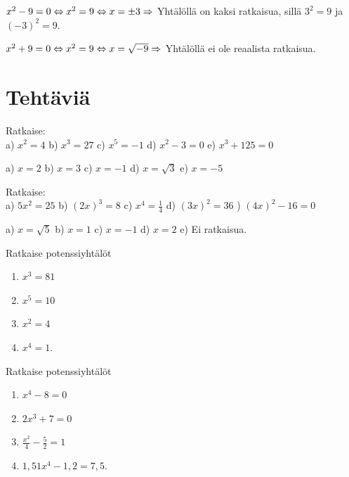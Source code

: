 \begin{esimerkki}
$x^2 - 9 = 0 \Leftrightarrow x^2 = 9 \Leftrightarrow x = \pm 3 \\
\Rightarrow$ Yhtälöllä on kaksi ratkaisua, sillä $3^2 = 9$ ja $(-3)^2 = 9$.
\end{esimerkki}

\begin{esimerkki}
$x^2 + 9 = 0 \Leftrightarrow x^2 = 9 \Leftrightarrow x = \sqrt{-9} \\
\Rightarrow$ Yhtälöllä ei ole reaalista ratkaisua.
\end{esimerkki}

\section*{Tehtäviä}

\begin{tehtava}
Ratkaise: \\
a) $ x^2 = 4 $ \qquad
b) $ x^3 = 27 $ \qquad
c) $ x^5 = -1 $ \qquad
d) $ x^2 - 3 = 0 $ \qquad
e) $ x^3 + 125 = 0 $
\begin{vastaus}
a) $ x = 2 $ \qquad
b) $ x = 3 $ \qquad
c) $ x = -1 $ \qquad
d) $ x = \sqrt{3} $ \qquad
e) $ x = -5 $ 
\end{vastaus}
\end{tehtava}

\begin{tehtava}
Ratkaise: \\
a) $ 5x^2 = 25 $ \qquad
b) $ (2x)^3 = 8 $ \qquad
c) $ x^4 = \frac{1}{4} $ \qquad
d) $ (3x)^2 = 36 $ ) $ (4x)^2 - 16 = 0 $ 
\begin{vastaus}
a) $ x = \sqrt{5} $ \qquad
b) $ x = 1 $ \qquad
c) $ x = -1 $ \qquad
d) $ x = 2 $ \qquad
e) Ei ratkaisua. 
\end{vastaus}
\end{tehtava}

\begin{tehtava}
Ratkaise potenssiyhtälöt
\begin{enumerate}
\item $x^3 = 81$
\item $x^5 = 10$
\item $x^2 = 4$
\item $x^4 = 1$.
\end{enumerate}
\end{tehtava}

\begin{tehtava}
Ratkaise potenssiyhtälöt
\begin{enumerate}
\item $x^4 - 8 = 0$
\item $2x^3 + 7 = 0$
\item $\frac{x^2}{4} - \frac{5}{2} = 1$
\item $1,51 x^4 - 1,2 = 7,5$.
\end{enumerate}
\end{tehtava}

